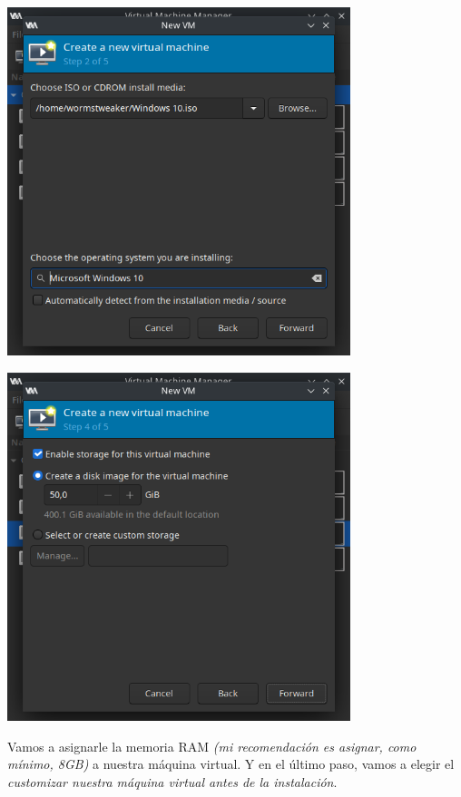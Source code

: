 \documentclass[12pt]{article}
\begin{document}
\begin{multicols}{2}
\begin{minipage}[t]{\linewidth}%
\vspace{0pt}
\includegraphics[width=0.75\textwidth]{images/vm-iso-selection.png}
\end{minipage}
\begin{minipage}[t]{\linewidth}%
\vspace{0pt}
\includegraphics[width=0.75\textwidth]{images/vm-disk-creation.png}
\end{minipage}
\end{multicols}

Vamos a asignarle la memoria RAM \emph{(mi recomendación es asignar, como mínimo, 8GB)} a nuestra máquina virtual. Y en el último paso, vamos a elegir el \emph{customizar nuestra máquina virtual antes de la instalación}.
\end{document}
